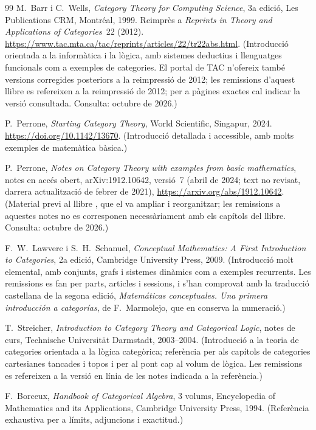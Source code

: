\begin{thebibliography}{99}
M.~Barr i C.~Wells,
\emph{Category Theory for Computing Science},
3a edició, Les Publications CRM, Montréal, 1999. Reimprès a \emph{Reprints in Theory and Applications of Categories}~22 (2012). \url{https://www.tac.mta.ca/tac/reprints/articles/22/tr22abs.html}.
\newblock (Introducció orientada a la informàtica i la lògica, amb sistemes deductius i llenguatges funcionals com a exemples de categories. El portal de TAC n'ofereix també versions corregides posteriors a la reimpressió de 2012; les remissions d'aquest llibre es refereixen a la reimpressió de 2012; per a pàgines exactes cal indicar la versió consultada. Consulta: octubre de 2026.)

P.~Perrone,
\emph{Starting Category Theory},
World Scientific, Singapur, 2024. \url{https://doi.org/10.1142/13670}.
\newblock (Introducció detallada i accessible, amb molts exemples de matemàtica bàsica.)

P.~Perrone,
\emph{Notes on Category Theory with examples from basic mathematics},
notes en accés obert, arXiv:1912.10642, versió~7 (abril de 2024; text no revisat, darrera actualització de febrer de 2021), \url{https://arxiv.org/abs/1912.10642}.
\newblock (Material previ al llibre \cite{perrone}, que el va ampliar i reorganitzar; les remissions a aquestes notes no es corresponen necessàriament amb els capítols del llibre. Consulta: octubre de 2026.)

F.~W.~Lawvere i S.~H.~Schanuel,
\emph{Conceptual Mathematics: A First Introduction to Categories},
2a edició, Cambridge University Press, 2009.
\newblock (Introducció molt elemental, amb conjunts, grafs i sistemes dinàmics com a exemples recurrents. Les remissions es fan per parts, articles i sessions, i s'han comprovat amb la traducció castellana de la segona edició, \emph{Matemáticas conceptuales. Una primera introducción a categorías}, de F.~Marmolejo, que en conserva la numeració.)

T.~Streicher,
\emph{Introduction to Category Theory and Categorical Logic},
notes de curs, Technische Universität Darmstadt, 2003--2004.
\newblock (Introducció a la teoria de categories orientada a la lògica categòrica; referència per als capítols de categories cartesianes tancades i topos i per al pont cap al volum de lògica. Les remissions es refereixen a la versió en línia de les notes indicada a la referència.)

F.~Borceux,
\emph{Handbook of Categorical Algebra},
3 volums, Encyclopedia of Mathematics and its Applications, Cambridge University Press, 1994.
\newblock (Referència exhaustiva per a límits, adjuncions i exactitud.)


\end{thebibliography}
